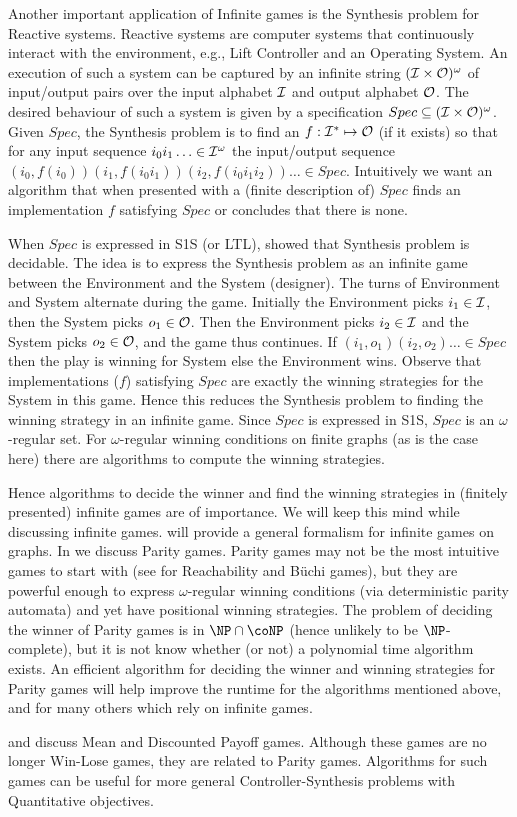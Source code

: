 Another important application of Infinite games is the Synthesis problem for Reactive systems. Reactive systems are computer systems that continuously interact with the environment, e.g., Lift Controller and an Operating System. An execution of such a system can be captured by an infinite string $(\mathcal{I} \times \mathcal{O})^\omega$ of input/output pairs over the input alphabet $\mathcal{I}$ and output alphabet $\mathcal{O}$. The desired behaviour of such a system is given by a specification $Spec \subseteq (\mathcal{I} \times \mathcal{O})^\omega$. Given $Spec$, the Synthesis problem is to find an $f: \mathcal{I}^* \mapsto \mathcal{O}$ (if it exists)  so that for any input sequence $i_0i_1 \ldots \in \mathcal{I}^\omega$ the input/output sequence  $(i_0,f(i_0))(i_1,f(i_0i_1))(i_2,f(i_0i_1i_2)) \ldots \in Spec$. Intuitively we want an algorithm that when presented with a (finite description of) $Spec$ finds an implementation $f$ satisfying $Spec$ or concludes that there is none.

When $Spec$ is expressed in S1S (or LTL), \cite{synthesis} showed that Synthesis problem is decidable. The idea is to express the Synthesis problem as an infinite game between the Environment and the System (designer). The turns of Environment and System alternate during the game. Initially the Environment picks $i_1 \in \mathcal{I}$, then the System picks $o_1 \in \mathcal{O}$. Then the Environment picks $i_2 \in \mathcal{I}$ and the System picks $o_2 \in \mathcal{O}$, and the game thus continues. If $(i_1,o_1)(i_2,o_2) \ldots \in Spec$ then the play is winning for System else the Environment wins. Observe that implementations ($f$) satisfying $Spec$ are exactly the winning strategies for the System in this game. Hence this reduces the Synthesis problem to finding the winning strategy in an infinite game. Since $Spec$ is expressed in S1S, $Spec$ is an $\omega$-regular set. For $\omega$-regular winning conditions on finite graphs (as is the case here) there are algorithms to compute the winning strategies.

Hence algorithms to decide the winner and find the winning strategies in (finitely presented) infinite games are of importance. We will keep this mind while discussing infinite games.  will provide a general formalism for infinite games on graphs. In  we discuss Parity games. Parity games may not be the most intuitive games to start with (see \cite[Chap~2]{thomas2002automata} for Reachability and B\"uchi games), but they are powerful enough to express $\omega$-regular winning conditions (via deterministic parity automata) and yet have positional winning strategies. The problem of deciding the winner of Parity games is in $\NP \cap \coNP$ (hence unlikely to be $\NP$-complete), but it is not know whether (or not) a polynomial time algorithm exists. An efficient algorithm for deciding the winner and winning strategies for Parity games will help improve the runtime for the algorithms mentioned above, and for many others which rely on infinite games.

 and  discuss Mean and Discounted Payoff games. Although these games are no longer Win-Lose games, they are related to Parity games. Algorithms for such games can be useful for more general Controller-Synthesis problems with Quantitative objectives.

